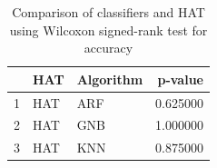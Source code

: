 \begin{table}
\footnotesize
\caption{Comparison of classifiers and HAT using Wilcoxon signed-rank test for accuracy}
\label{tab:HAT wilcoxon ACC comparison}
\begin{tabular}{lllr}
\hline
 & HAT & Algorithm & p-value \\
\hline
1 & HAT & ARF & 0.625000 \\
2 & HAT & GNB & 1.000000 \\
3 & HAT & KNN & 0.875000 \\
\hline
\end{tabular}
\end{table}
